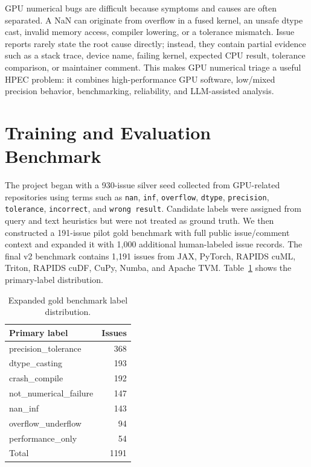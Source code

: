 \documentclass[conference]{IEEEtran}
\begin{document}
GPU numerical bugs are difficult because symptoms and causes are often
separated. A NaN can originate from overflow in a fused kernel, an unsafe dtype
cast, invalid memory access, compiler lowering, or a tolerance mismatch. Issue
reports rarely state the root cause directly; instead, they contain partial
evidence such as a stack trace, device name, failing kernel, expected CPU
result, tolerance comparison, or maintainer comment. This makes GPU numerical
triage a useful HPEC problem: it combines high-performance GPU software,
low/mixed precision behavior, benchmarking, reliability, and LLM-assisted
analysis.

\section{Training and Evaluation Benchmark}

The project began with a 930-issue silver seed collected from GPU-related
repositories using terms such as \texttt{nan}, \texttt{inf},
\texttt{overflow}, \texttt{dtype}, \texttt{precision}, \texttt{tolerance},
\texttt{incorrect}, and \texttt{wrong result}. Candidate labels were assigned
from query and text heuristics but were not treated as ground truth. We then
constructed a 191-issue pilot gold benchmark with full public issue/comment
context and expanded it with 1,000 additional human-labeled issue records. The
final v2 benchmark contains 1,191 issues from JAX, PyTorch, RAPIDS cuML,
Triton, RAPIDS cuDF, CuPy, Numba, and Apache TVM. Table~\ref{tab:labels}
shows the primary-label distribution.

\begin{table}[t]
\centering
\caption{Expanded gold benchmark label distribution.}
\label{tab:labels}
\begin{tabular}{lr}
\toprule
Primary label & Issues \\
\midrule
precision\_tolerance & 368 \\
dtype\_casting & 193 \\
crash\_compile & 192 \\
not\_numerical\_failure & 147 \\
nan\_inf & 143 \\
overflow\_underflow & 94 \\
performance\_only & 54 \\
\midrule
Total & 1191 \\
\bottomrule
\end{tabular}
\end{table}
\end{document}
